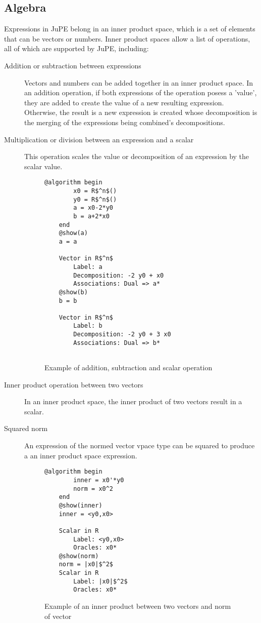 \subsection*{Algebra}
Expressions in JuPE belong in an inner product space, which is a set of elements that can be vectors or numbers. Inner product spaces allow a list of operations, all of which are supported by JuPE, including:
\begin{description}
	\item[Addition or subtraction between expressions] Vectors and numbers can be added together in an inner product space. In an addition operation, if both expressions of the operation posess a 'value', they are added to create the value of a new resulting expression. Otherwise, the result is a new expression is created whose decomposition is the merging of the expressions being combined's decompositions.
	\item[Multiplication or division between an expression and a scalar] This operation scales the value or decomposition of an expression by the scalar value.
	\begin{figure}[hbtp]
		\caption{Example of addition, subtraction and scalar operation}
		\label{ex_algebra1}
		\begin{lstlisting}[mathescape]
	@algorithm begin
		x0 = R$^n$()
		y0 = R$^n$()
		a = x0-2*y0
		b = a+2*x0
	end
	@show(a)
	a = a

	Vector in R$^n$
		Label: a
		Decomposition: -2 y0 + x0
		Associations: Dual => a*
	@show(b)
	b = b
	
	Vector in R$^n$
		Label: b
		Decomposition: -2 y0 + 3 x0
		Associations: Dual => b*
	
		\end{lstlisting}
	\end{figure}

	\item[Inner product operation between two vectors] In an inner product space, the inner product of two vectors result in a scalar.
	\item[Squared norm] An expression of the normed vector vpace type can be squared to produce a an inner product space expression.
	\begin{figure}[hbtp]
		\caption{Example of an inner product between two vectors and norm of vector}
		\label{ex_innerandnorm}
		\begin{lstlisting}[mathescape]
	@algorithm begin
		inner = x0'*y0
		norm = x0^2
	end
	@show(inner)
	inner = <y0,x0>

	Scalar in R
		Label: <y0,x0>
		Oracles: x0*
	@show(norm)
	norm = |x0|$^2$
	Scalar in R
		Label: |x0|$^2$
		Oracles: x0*
		\end{lstlisting}
	\end{figure}
\end{description}

